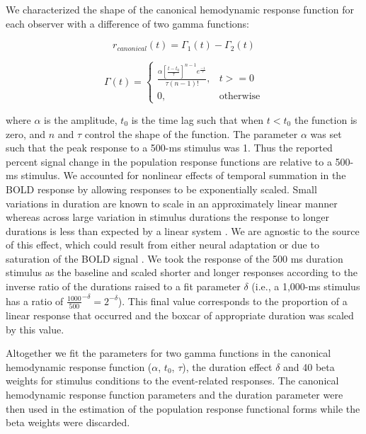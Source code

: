\documentclass{report}
\begin{document}
We characterized the shape of the canonical hemodynamic response function for each observer with a difference of two gamma functions:

\begin{equation}
    r_{canonical}(t) = \Gamma_1(t)-\Gamma_2(t)
\end{equation}

\begin{equation}
    \Gamma(t)=
\begin{cases}
    \frac{\alpha[\frac{t-t_0}{\tau}]^{n-1}e^{\frac{-1}{\tau}}}{\tau(n-1)!},& t >= 0\\
    0,              & \text{otherwise}
\end{cases}
\end{equation}

where $\alpha$ is the amplitude, $t_0$ is the time lag such that when $t < t_0$ the function is zero, and $n$ and $\tau$ control the shape of the function. The parameter $\alpha$ was set such that the peak response to a 500-ms stimulus was 1. Thus the reported percent signal change in the population response functions are relative to a 500-ms stimulus.
We accounted for nonlinear effects of temporal summation in the BOLD response by allowing responses to be exponentially scaled. Small variations in duration are known to scale in an approximately linear manner \citep{Boynton1996-ff} whereas across large variation in stimulus durations the response to longer durations is less than expected by a linear system \citep{Boynton2012-xy}. We are agnostic to the source of this effect, which could result from either neural adaptation \citep{Buxton2004-rg} or due to saturation of the BOLD signal \citep{Friston1998-bo}. We took the response of the 500 ms duration stimulus as the baseline and scaled shorter and longer responses according to the inverse ratio of the durations raised to a fit parameter $\delta$ (i.e., a 1,000-ms stimulus has a ratio of $\frac{1000}{500}^{-\delta}=2^{-\delta}$). This final value corresponds to the proportion of a linear response that occurred and the boxcar of appropriate duration was scaled by this value.

Altogether we fit the parameters for two gamma functions in the canonical hemodynamic response function ($\alpha$, $t_0$, $\tau$), the duration effect $\delta$ and 40 beta weights for stimulus conditions to the event-related responses. The canonical hemodynamic response function parameters and the duration parameter were then used in the estimation of the population response functional forms while the beta weights were discarded.
\end{document}
